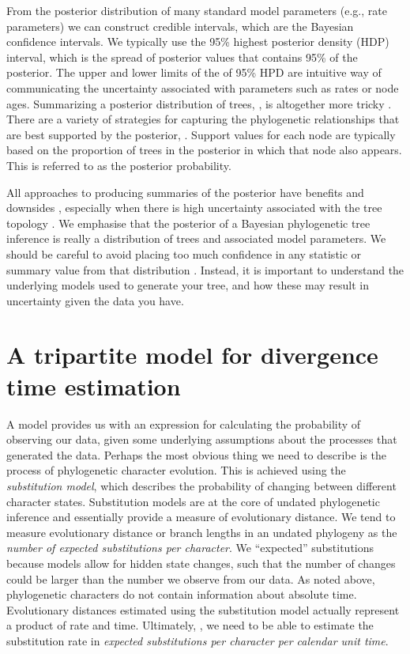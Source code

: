 From the posterior distribution of many standard model parameters (e.g., rate parameters) we can construct credible intervals, which are the Bayesian  confidence intervals.
We typically use the 95\% highest posterior density (HDP) interval, which is the spread of posterior values that contains 95\% of the posterior.
The upper and lower limits of the of 95\% HPD are  intuitive way of communicating the uncertainty associated with parameters such as rates or node ages.
Summarizing a posterior distribution of trees, , is altogether more tricky \citep{heled2013,OReilly2018}.
There are a variety of strategies for capturing the phylogenetic relationships that are best supported by the posterior, .
Support values for each node are typically based on the proportion of trees in the posterior in which that node also appears.
This is referred to as the posterior probability.

All approaches to producing summaries of the posterior have benefits and downsides \citep{heled2013}, especially when there is high uncertainty associated with the tree topology \citep{OReilly2018}.
We emphasise that the posterior of a Bayesian phylogenetic tree inference is really a distribution of trees and associated model parameters.
We should be careful to avoid placing too much confidence in any statistic or summary value from that distribution \citep{Warnock2017}.
Instead, it is important to understand the underlying models used to generate your tree, and how these may result in uncertainty given the data you have.

\section{A tripartite model for divergence time estimation}

A model provides us with an expression for calculating the probability of observing our data, given some underlying assumptions about the processes that generated the data.
Perhaps the most obvious thing we need to describe is the process of phylogenetic character evolution.
This is achieved  using the \textit{substitution model}, which describes the probability of changing between different character states.
Substitution models are at the core of undated phylogenetic inference and essentially provide a measure of evolutionary distance.
We tend to measure evolutionary distance or branch lengths in an undated phylogeny as the \textit{number of expected substitutions per character}. We  ``expected'' substitutions because models allow for hidden state changes, such that the number of changes could be larger than the number we observe from our data.
As noted above, phylogenetic characters do not contain information about absolute time. Evolutionary distances estimated using the substitution model actually represent a product of rate and time.
Ultimately, , we need to be able to estimate the substitution rate in \textit{expected substitutions per character per calendar unit time}.

